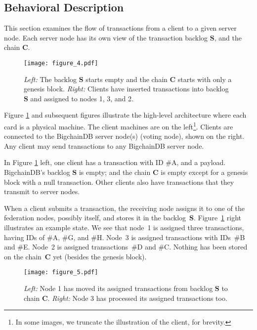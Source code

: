 \subsection{Behavioral Description}
This section examines the flow of transactions from a client to a given server node.
Each server node has its own view of the transaction backlog $\mathbf{S}$, and the chain $\mathbf{C}$.

\begin{figure}[!ht]
  \centering
  \texttt{[image: figure\_4.pdf]}
  \caption{\textit{Left:} The backlog $\mathbf{S}$ starts empty and the chain $\mathbf{C}$ starts with only a genesis block.
  \textit{Right:} Clients have inserted transactions into backlog $\mathbf{S}$ and assigned to nodes 1, 3, and 2.}
  \label{fig:bigchaindb_architecture_step1}
\end{figure}

Figure \ref{fig:bigchaindb_architecture_step1} and subsequent figures illustrate the high-level architecture where each card is a physical machine.
The client machines are on the left\footnote{In some images, we truncate the illustration of the client, for brevity.}.
Clients are connected to the BigchainDB server node(s) (voting node), shown on the right. Any client may send transactions to any BigchainDB server node.

In Figure \ref{fig:bigchaindb_architecture_step1} left, one client has a transaction with ID \textsf{$\#$A}, and a payload.
BigchainDB’s backlog $\mathbf{S}$ is empty; and the chain $\mathbf{C}$ is empty except for a genesis block with a null transaction.
Other clients also have transactions that they transmit to server nodes.

When a client submits a transaction, the receiving node assigns it to one of the federation nodes, possibly itself, and stores it in the backlog~$\mathbf{S}$.
Figure~\ref{fig:bigchaindb_architecture_step1} right illustrates an example state.
We see that node~1 is assigned three transactions, having IDs of \textsf{$\#$A}, \textsf{$\#$G}, and \textsf{$\#$H}.
Node~3 is assigned transactions with IDs~\textsf{$\#$B} and \textsf{$\#$E}.
Node~2 is assigned transactions~\textsf{$\#$D} and \textsf{$\#$C}. Nothing has been stored on the chain~$\mathbf{C}$ yet (besides the genesis block).

\begin{figure}[!ht]
  \centering
  \texttt{[image: figure\_5.pdf]}
  \caption{\textit{Left:} Node 1 has moved its assigned transactions from backlog $\mathbf{S}$ to chain $\mathbf{C}$.
  \textit{Right:} Node 3 has processed its assigned transactions too.}
  \label{fig:bigchaindb_architecture_step2}
\end{figure}

